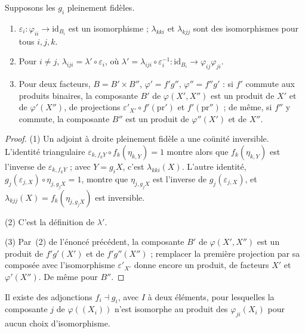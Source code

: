 \begin{enonce}
Supposons les $g_i$ pleinement fidèles.
\begin{enumerate}
\item $\varepsilon_i : \varphi_{ii} \to \mathrm{id}_{B_i}$ est un isomorphisme ; $\lambda_{kki}$ et $\lambda_{kjj}$ sont des isomorphismes pour tous $i, j, k$.
\item Pour $i \neq j$, $\lambda_{iji} = \lambda' \circ \varepsilon_i$, où $\lambda' = \lambda_{iji} \circ \varepsilon_i^{-1} : \mathrm{id}_{B_i} \to \varphi_{ij}\varphi_{ji}$.
\item Pour deux facteurs, $B = B' \times B''$, $\varphi' = f' g''$, $\varphi'' = f'' g'$ : si $f'$ commute aux produits binaires, la composante $B'$ de $\varphi(X', X'')$ est un produit de $X'$ et de $\varphi'(X'')$, de projections $\varepsilon'_{X'} \circ f'(\mathrm{pr}')$ et $f'(\mathrm{pr}'')$ ; de même, si $f''$ y commute, la composante $B''$ est un produit de $\varphi''(X')$ et de $X''$.
\end{enumerate}
\end{enonce}

\begin{proof}
(1) Un adjoint à droite pleinement fidèle a une coünité inversible. L'identité triangulaire $\varepsilon_{k, f_k Y} \circ f_k(\eta_{k, Y}) = 1$ montre alors que $f_k(\eta_{k, Y})$ est l'inverse de $\varepsilon_{k, f_k Y}$ ; avec $Y = g_i X$, c'est $\lambda_{kki}(X)$. L'autre identité, $g_j(\varepsilon_{j, X}) \circ \eta_{j, g_j X} = 1$, montre que $\eta_{j, g_j X}$ est l'inverse de $g_j(\varepsilon_{j, X})$, et $\lambda_{kjj}(X) = f_k(\eta_{j, g_j X})$ est inversible.

(2) C'est la définition de $\lambda'$.

(3) Par~(2) de l'énoncé précédent, la composante $B'$ de $\varphi(X', X'')$ est un produit de $f'g'(X')$ et de $f'g''(X'')$ ; remplacer la première projection par sa composée avec l'isomorphisme $\varepsilon'_{X'}$ donne encore un produit, de facteurs $X'$ et $\varphi'(X'')$. De même pour $B''$.
\end{proof}

\begin{encadre}
\begin{contrexemple}
Il existe des adjonctions $f_i \dashv g_i$, avec $I$ à deux éléments, pour lesquelles la composante $j$ de $\varphi((X_i))$ n'est isomorphe au produit des $\varphi_{ji}(X_i)$ pour aucun choix d'isomorphisme.
\end{contrexemple}
\end{encadre}

